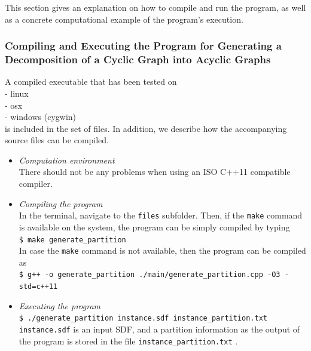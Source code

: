 \documentclass[11pt,titlepage,dvipdfmx,twoside]{book}
\begin{document}
This section gives an explanation on how to compile and run the program,
as well as a concrete computational example of the program's execution.


\subsubsection{
Compiling and Executing the Program for Generating
a Decomposition of a Cyclic Graph  into Acyclic Graphs
}
\label{chap:compile_p}

A compiled executable that has been tested on\\
- linux \\
- osx \\
- windows (cygwin) \\
is included in the set of files.
In addition, we describe how the accompanying source files can be compiled.

\begin{itemize}
	\item {\em Computation environment}\\
		There should not be any problems when using an ISO C++11 compatible compiler. %
	\item {\em Compiling the program}\\
	      In the terminal, navigate to the {\tt files} subfolder.
	      Then, if the {\tt make} command is available on the system, the program can be simply compiled by typing \\
	      \verb|$ make generate_partition|\\
	      In case the {\tt make} command is not available, then the program can be compiled as \\	      
		\verb|$ g++ -o generate_partition ./main/generate_partition.cpp -O3 -std=c++11|\\
	\item {\em Executing the program}\\
		\verb|$ ./generate_partition instance.sdf instance_partition.txt|\\
		\verb|instance.sdf|  is an input SDF, 
		and a partition information as the output of the program is stored in the file
	  \verb|instance_partition.txt| .
\end{itemize}
\end{document}
